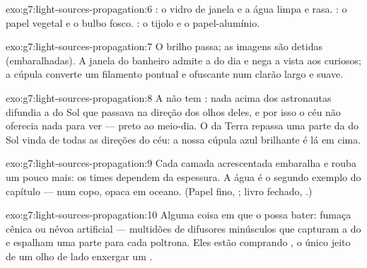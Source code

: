 \begin{solution}{exo:g7:light-sources-propagation:6}
: o vidro de janela e a água limpa e rasa. :
o papel vegetal e o bulbo fosco. : o tijolo e o papel-alumínio.
\end{solution}

\begin{solution}{exo:g7:light-sources-propagation:7}
O brilho passa; as imagens são detidas (embaralhadas). A janela do
banheiro admite a  do dia e nega a vista aos curiosos; a cúpula
converte um filamento pontual e ofuscante num clarão largo e suave.
\end{solution}

\begin{solution}{exo:g7:light-sources-propagation:8}
A  não tem : nada acima dos astronautas difundia a  do Sol
que passava na direção dos olhos deles, e por isso o céu não oferecia
nada para ver --- preto ao meio-dia. O  da Terra repassa uma parte
da  do Sol vinda de todas as direções do céu: a nossa cúpula azul
brilhante é  lá em cima.
\end{solution}

\begin{solution}{exo:g7:light-sources-propagation:9}
Cada camada acrescentada embaralha e rouba um pouco mais: os times
dependem da espessura. A água é o segundo exemplo do capítulo ---
 num copo, opaca em oceano. (Papel fino, ;
livro fechado, .)
\end{solution}

\begin{solution}{exo:g7:light-sources-propagation:10}
Alguma coisa em que o  possa bater: fumaça cênica ou névoa
artificial --- multidões de difusores minúsculos que capturam a 
do  e espalham uma parte para cada poltrona. Eles estão
comprando , o único jeito de um olho de lado enxergar um
.
\end{solution}

